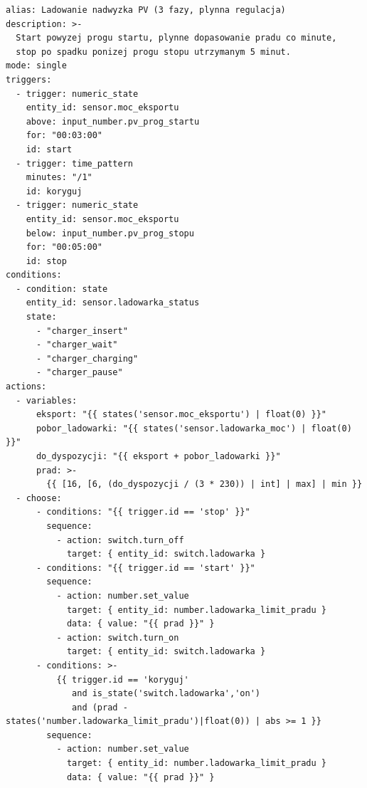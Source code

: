 \documentclass[11pt,a4paper]{article}
\begin{document}
\begin{lstlisting}
alias: Ladowanie nadwyzka PV (3 fazy, plynna regulacja)
description: >-
  Start powyzej progu startu, plynne dopasowanie pradu co minute,
  stop po spadku ponizej progu stopu utrzymanym 5 minut.
mode: single
triggers:
  - trigger: numeric_state
    entity_id: sensor.moc_eksportu
    above: input_number.pv_prog_startu
    for: "00:03:00"
    id: start
  - trigger: time_pattern
    minutes: "/1"
    id: koryguj
  - trigger: numeric_state
    entity_id: sensor.moc_eksportu
    below: input_number.pv_prog_stopu
    for: "00:05:00"
    id: stop
conditions:
  - condition: state
    entity_id: sensor.ladowarka_status
    state:
      - "charger_insert"
      - "charger_wait"
      - "charger_charging"
      - "charger_pause"
actions:
  - variables:
      eksport: "{{ states('sensor.moc_eksportu') | float(0) }}"
      pobor_ladowarki: "{{ states('sensor.ladowarka_moc') | float(0) }}"
      do_dyspozycji: "{{ eksport + pobor_ladowarki }}"
      prad: >-
        {{ [16, [6, (do_dyspozycji / (3 * 230)) | int] | max] | min }}
  - choose:
      - conditions: "{{ trigger.id == 'stop' }}"
        sequence:
          - action: switch.turn_off
            target: { entity_id: switch.ladowarka }
      - conditions: "{{ trigger.id == 'start' }}"
        sequence:
          - action: number.set_value
            target: { entity_id: number.ladowarka_limit_pradu }
            data: { value: "{{ prad }}" }
          - action: switch.turn_on
            target: { entity_id: switch.ladowarka }
      - conditions: >-
          {{ trigger.id == 'koryguj'
             and is_state('switch.ladowarka','on')
             and (prad - states('number.ladowarka_limit_pradu')|float(0)) | abs >= 1 }}
        sequence:
          - action: number.set_value
            target: { entity_id: number.ladowarka_limit_pradu }
            data: { value: "{{ prad }}" }
\end{lstlisting}
\end{document}
